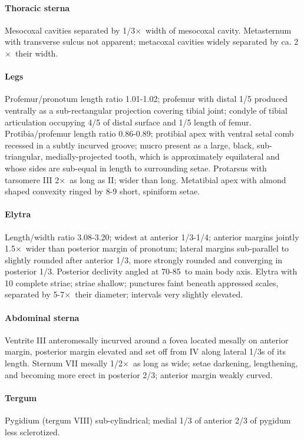 \documentclass[fleqn,10pt,lineno]{wlpeerj} %
\newcommand{\td}{\textdegree~}
\newcommand{\x}{$\times$~}
\begin{document}
			\paragraph{Thoracic sterna} 
				Mesocoxal cavities separated by 1/3\x width of mesocoxal cavity. 
				Metasternum with transverse sulcus not apparent; metacoxal cavities widely separated by ca. 2\x their width.
			\paragraph{Legs}
				Profemur/pronotum length ratio 1.01-1.02; profemur with distal 1/5 produced ventrally as a sub-rectangular projection covering tibial joint; condyle of tibial articulation occupying 4/5 of distal surface and 1/5 length of femur. 
				Protibia/profemur length ratio 0.86-0.89; protibial apex with ventral setal comb recessed in a subtly incurved groove; mucro present as a large, black, sub-triangular, medially-projected tooth, which is approximately equilateral and whose sides are sub-equal in length to surrounding setae. 
				Protarsus with tarsomere III 2\x as long as II; wider than long. 
				Metatibial apex with almond shaped convexity ringed by 8-9 short, spiniform setae.
			\paragraph{Elytra}
				Length/width ratio 3.08-3.20; widest at anterior 1/3-1/4; anterior margins jointly 1.5\x wider than posterior margin of pronotum; lateral margins sub-parallel to slightly rounded after anterior 1/3, more strongly rounded and converging in posterior 1/3. 
				Posterior declivity angled at 70-85\td to main body axis. Elytra with 10 complete striae; striae shallow; punctures faint beneath appressed scales, separated by 5-7\x their diameter; intervals very slightly elevated.
			\paragraph{Abdominal sterna}
				Ventrite III anteromesally incurved around a fovea located mesally on anterior margin, posterior margin elevated and set off from IV along lateral 1/3s of its length. 
				Sternum VII mesally 1/2\x as long as wide; setae darkening, lengthening, and becoming more erect in posterior 2/3; anterior margin weakly curved.
			\paragraph{Tergum}
				Pygidium (tergum VIII) sub-cylindrical; medial 1/3 of anterior 2/3 of pygidum less sclerotized.
\end{document}
